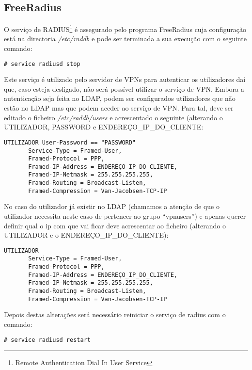 \subsection{FreeRadius}

O serviço de RADIUS\footnote{Remote Authentication Dial In User Service} é assegurado pelo programa FreeRadius cuja configuração está na directoria
\emph{/etc/raddb} e pode ser terminada a sua execução com o seguinte comando:

\begin{verbatim}
# service radiusd stop
\end{verbatim}

Este serviço é utilizado pelo servidor de VPNs para autenticar os utilizadores daí que, caso esteja desligado, não será possível utilizar o serviço de VPN. Embora a autenticação seja feita no LDAP, podem ser configurados utilizadores que não estão no LDAP mas que podem aceder ao serviço de VPN. Para tal, deve ser editado o ficheiro \emph{/etc/raddb/users} e acrescentado o seguinte (alterando o UTILIZADOR, PASSWORD e ENDEREÇO\_IP\_DO\_CLIENTE:

\begin{verbatim}
UTILIZADOR User-Password == "PASSWORD"
       Service-Type = Framed-User,
       Framed-Protocol = PPP,
       Framed-IP-Address = ENDEREÇO_IP_DO_CLIENTE,
       Framed-IP-Netmask = 255.255.255.255,
       Framed-Routing = Broadcast-Listen,
       Framed-Compression = Van-Jacobsen-TCP-IP
\end{verbatim}

No caso do utilizador já existir no LDAP (chamamos a atenção de que o utilizador necessita neste caso de pertencer ao grupo ``vpnusers'') e apenas querer definir qual o ip com que vai ficar deve acrescentar ao ficheiro (alterando o UTILIZADOR e o ENDEREÇO\_IP\_DO\_CLIENTE):

\begin{verbatim}
UTILIZADOR
       Service-Type = Framed-User,
       Framed-Protocol = PPP,
       Framed-IP-Address = ENDEREÇO_IP_DO_CLIENTE,
       Framed-IP-Netmask = 255.255.255.255,
       Framed-Routing = Broadcast-Listen,
       Framed-Compression = Van-Jacobsen-TCP-IP
\end{verbatim}

Depois destas alterações será necessário reiniciar o serviço de radius com o comando:

\begin{verbatim}
# service radiusd restart
\end{verbatim}


